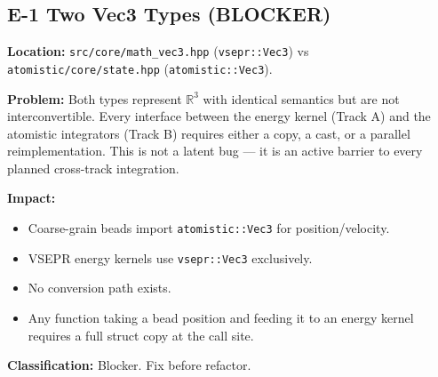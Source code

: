 \documentclass[11pt,a4paper]{article}
\begin{document}
\subsection{E-1 \textemdash{} Two Vec3 Types (BLOCKER)}
\begin{mdframed}[backgroundcolor=red!8]
\textbf{Location:} \texttt{src/core/math\_vec3.hpp} (\texttt{vsepr::Vec3}) vs
\texttt{atomistic/core/state.hpp} (\texttt{atomistic::Vec3}).

\textbf{Problem:} Both types represent $\mathbb{R}^3$ with identical semantics but
are not interconvertible. Every interface between the energy kernel (Track A)
and the atomistic integrators (Track B) requires either a copy, a cast, or a
parallel reimplementation. This is not a latent bug --- it is an active barrier
to every planned cross-track integration.

\textbf{Impact:}
\begin{itemize}
  \item Coarse-grain beads import \texttt{atomistic::Vec3} for position/velocity.
  \item VSEPR energy kernels use \texttt{vsepr::Vec3} exclusively.
  \item No conversion path exists.
  \item Any function taking a bead position and feeding it to an energy kernel
        requires a full struct copy at the call site.
\end{itemize}

\textbf{Classification:} Blocker. Fix before refactor.
\end{mdframed}
\end{document}
